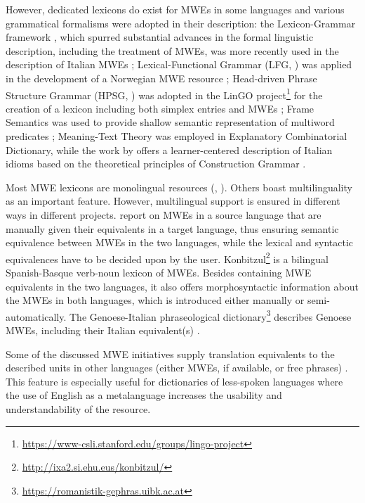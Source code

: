 \documentclass[output=paper,colorlinks,citecolor=brown]{langscibook}
\begin{document}
However, dedicated lexicons do exist for MWEs in some languages and various grammatical formalisms were adopted in their description: the Lexicon-Grammar framework \citep{gross-methodes-1975, gross-1982}, which spurred substantial advances in the formal linguistic description, including the treatment of MWEs, was more recently used in the description of Italian MWEs \citep{Vietri2014,Monti2014}; Lexical-Functional Grammar (LFG, \citealt{bresnan,Dalrymple2023}) was applied in the development of a Norwegian MWE resource \citep{dyvik2019}; Head-driven Phrase Structure Grammar (HPSG, \citealt{hpsg-1,hpsg-2,Müller2021}) was adopted in the LinGO project\footnote{\url{https://www-csli.stanford.edu/groups/lingo-project}} for the creation of a lexicon including both simplex entries and MWEs \citep{villavicencio-LexicalEncoding}; Frame Semantics was used to provide shallow semantic representation of multiword predicates ; Meaning-Text Theory \citep{MTT} was employed in  Explanatory Combinatorial Dictionary, while the work by \citet{Schafroth2015} offers a learner-centered description of Italian idioms based on the theoretical principles of Construction Grammar \citep{constrgr}.

Most MWE lexicons are monolingual resources (\cite{fellbaum2005,gregoire-2007,Odijk2013,shudo_etal_2011,villavicencio-LexicalEncoding,Vietri2014,Schafroth2015,ECD,markantonatou-etal-2019-idion}, ). Others boast multilinguality as an important feature. However, multilingual support is ensured in different ways in different projects. \citet{villavicencio-etal-2004-multilingual} report on MWEs in a source language that are manually given their equivalents in a target language, thus ensuring semantic equivalence between MWEs in the two languages, while the lexical and syntactic equivalences have to be decided upon by the user. 
Konbitzul\footnote{\url{http://ixa2.si.ehu.eus/konbitzul/}} \citep{inurrieta-etal-2018-konbitzul} is a bilingual Spanish-Basque verb-noun lexicon of MWEs. Besides containing MWE equivalents in the two languages, it also offers morphosyntactic information about the MWEs in both languages, which is introduced either manually or semi-automatically.
The Genoese-Italian phraseological dictionary\footnote{\url{https://romanistik-gephras.uibk.ac.at}} describes Genoese MWEs, including their Italian equivalent(s) \citep{Autelli2020}.

Some of the discussed MWE initiatives supply translation equivalents to the described units in other languages (either MWEs, if available, or free phrases) \citep{markantonatou-etal-2019-idion,markantonatou-etal-in-prep,chapters/02}. This feature is especially useful for dictionaries of less-spoken languages where the use of English as a metalanguage increases the usability and understandability of the resource.
\end{document}
